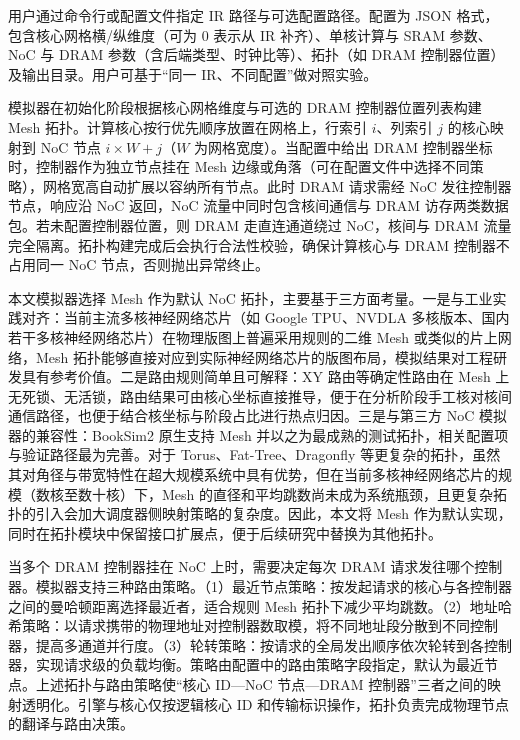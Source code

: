 
用户通过命令行或配置文件指定 IR 路径与可选配置路径。配置为 JSON 格式，包含核心网格横/纵维度（可为 0 表示从 IR 补齐）、单核计算与 SRAM 参数、NoC 与 DRAM 参数（含后端类型、时钟比等）、拓扑（如 DRAM 控制器位置）及输出目录。用户可基于“同一 IR、不同配置”做对照实验。

模拟器在初始化阶段根据核心网格维度与可选的 DRAM 控制器位置列表构建 Mesh 拓扑。计算核心按行优先顺序放置在网格上，行索引 $i$、列索引 $j$ 的核心映射到 NoC 节点 $i \times W + j$（$W$ 为网格宽度）。当配置中给出 DRAM 控制器坐标时，控制器作为独立节点挂在 Mesh 边缘或角落（可在配置文件中选择不同策略），网格宽高自动扩展以容纳所有节点。此时 DRAM 请求需经 NoC 发往控制器节点，响应沿 NoC 返回，NoC 流量中同时包含核间通信与 DRAM 访存两类数据包。若未配置控制器位置，则 DRAM 走直连通道绕过 NoC，核间与 DRAM 流量完全隔离。拓扑构建完成后会执行合法性校验，确保计算核心与 DRAM 控制器不占用同一 NoC 节点，否则抛出异常终止。

本文模拟器选择 Mesh 作为默认 NoC 拓扑，主要基于三方面考量。一是与工业实践对齐：当前主流多核神经网络芯片（如 Google TPU、NVDLA 多核版本、国内若干多核神经网络芯片）在物理版图上普遍采用规则的二维 Mesh 或类似的片上网络，Mesh 拓扑能够直接对应到实际神经网络芯片的版图布局，模拟结果对工程研发具有参考价值。二是路由规则简单且可解释：XY 路由等确定性路由在 Mesh 上无死锁、无活锁，路由结果可由核心坐标直接推导，便于在分析阶段手工核对核间通信路径，也便于结合核坐标与阶段占比进行热点归因。三是与第三方 NoC 模拟器的兼容性：BookSim2 原生支持 Mesh 并以之为最成熟的测试拓扑，相关配置项与验证路径最为完善。对于 Torus、Fat-Tree、Dragonfly 等更复杂的拓扑，虽然其对角径与带宽特性在超大规模系统中具有优势，但在当前多核神经网络芯片的规模（数核至数十核）下，Mesh 的直径和平均跳数尚未成为系统瓶颈，且更复杂拓扑的引入会加大调度器侧映射策略的复杂度。因此，本文将 Mesh 作为默认实现，同时在拓扑模块中保留接口扩展点，便于后续研究中替换为其他拓扑。

当多个 DRAM 控制器挂在 NoC 上时，需要决定每次 DRAM 请求发往哪个控制器。模拟器支持三种路由策略。（1）最近节点策略：按发起请求的核心与各控制器之间的曼哈顿距离选择最近者，适合规则 Mesh 拓扑下减少平均跳数。（2）地址哈希策略：以请求携带的物理地址对控制器数取模，将不同地址段分散到不同控制器，提高多通道并行度。（3）轮转策略：按请求的全局发出顺序依次轮转到各控制器，实现请求级的负载均衡。策略由配置中的路由策略字段指定，默认为最近节点。上述拓扑与路由策略使“核心 ID—NoC 节点—DRAM 控制器”三者之间的映射透明化。引擎与核心仅按逻辑核心 ID 和传输标识操作，拓扑负责完成物理节点的翻译与路由决策。

